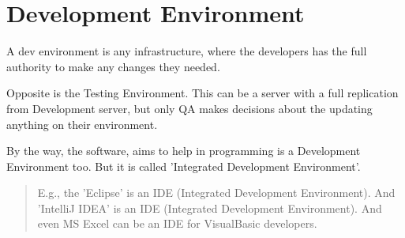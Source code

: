 \section{Development Environment}
\label{sec:Development Environment}

A dev environment is any infrastructure, where the developers has the full authority to make any changes they needed.

Opposite is the Testing Environment. This can be a server with a full replication from Development server, but only QA makes decisions about the updating anything on their environment.

By the way, the software, aims to help in programming is a Development Environment too. But it is called 'Integrated Development Environment'.

\begin{quote}
E.g., the 'Eclipse' is an IDE (Integrated Development Environment). And 'IntelliJ IDEA' is an IDE (Integrated Development Environment). And even MS Excel can be an IDE for VisualBasic developers. 
\end{quote} 
